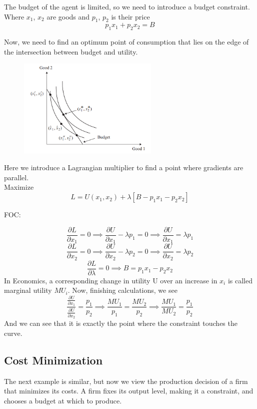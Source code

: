 \documentclass[]{article}
\begin{document}
The budget of the agent is limited, so we need to introduce a budget constraint. Where $x_1$, $x_2$ are goods and $p_1$, $p_2$ is their price    $$p_1x_1+p_2x_2=B$$

Now, we need to find an optimum point of consumption that lies on the edge of the intersection between budget and utility. 

\begin{figure}[h]
    \centering
    \includegraphics[width=0.60\textwidth]{indifference_curve.png}
\end{figure}

Here we introduce a Lagrangian multiplier to find a point where gradients are parallel. \\

 Maximize 
 $$L=U(x_1,x_2)+\lambda[B-p_1x_1-p_2x_2]$$

FOC:
   
$$
\frac{\partial L}{\partial x_1}=0 \implies \frac{\partial U}{\partial x_1}-\lambda p_1=0 \implies \frac{\partial U}{\partial x_1}=\lambda p_1
$$
$$
\frac{\partial L}{\partial x_2}=0 \implies \frac{\partial U}{\partial x_2}-\lambda p_2=0 \implies \frac{\partial U}{\partial x_2}=\lambda p_2
$$
$$
\frac{\partial L}{\partial \lambda}=0 \implies B=p_1 x_1-p_2 x_2
$$
In Economics, a corresponding change in utility U over an increase in $x_i$ is called marginal utility $MU_i$. Now, finishing calculations, we see 
$$
\frac{\frac{\partial U}{\partial x_1}}{\frac{\partial U}{\partial x_2}}=\frac{p_1}{p_2} \implies \frac{MU_1}{p_1}=\frac{MU_2}{p_2} \implies \frac{MU_1}{MU_2}=\frac{p_1}{p_2}
$$
And we can see that it is exactly the point where the constraint touches the curve.

\subsection{Cost Minimization}

The next example is similar, but now we view the production decision of a firm that minimizes its costs. A firm fixes its output level, making it a constraint, and chooses a budget at which to produce. 
\end{document}
